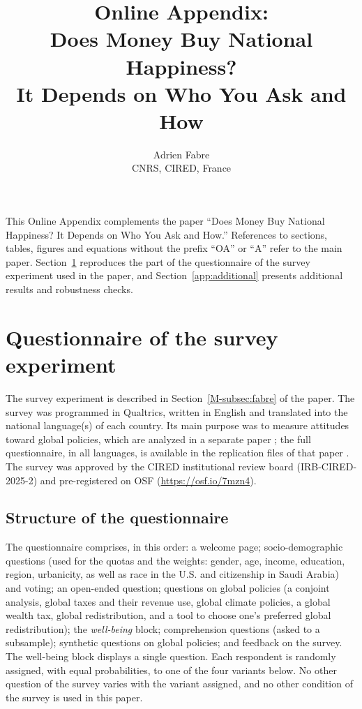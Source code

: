 \documentclass[12pt]{article}
\title{Online Appendix:\\ Does Money Buy National Happiness?\\It Depends on Who You Ask and How}
\author{Adrien Fabre\\[.5ex] \normalsize CNRS, CIRED, France}
\date{}
\begin{document}
\maketitle
\thispagestyle{plain}

\noindent This Online Appendix complements the paper ``Does Money Buy National Happiness? It Depends on Who You Ask and How.'' References to sections, tables, figures and equations without the prefix ``OA'' or ``A'' refer to the main paper. Section~\ref{app:questionnaire} reproduces the part of the questionnaire of the survey experiment used in the paper, and Section~\ref{app:additional} presents additional results and robustness checks.

\section{Questionnaire of the survey experiment}\label{app:questionnaire}

The survey experiment is described in Section~\ref{M-subsec:fabre} of the paper. The survey was programmed in Qualtrics, written in English and translated into the national language(s) of each country. Its main purpose was to measure attitudes toward global policies, which are analyzed in a separate paper \citep{fabre_public_2025}; the full questionnaire, in all languages, is available in the replication files of that paper \citep{fabre_public_2025}. The survey was approved by the CIRED institutional review board (IRB-CIRED-2025-2) and pre-registered on OSF (\href{https://osf.io/7mzn4}{https://osf.io/7mzn4}).

\subsection{Structure of the questionnaire}

The questionnaire comprises, in this order: a welcome page; socio-demographic questions (used for the quotas and the weights: gender, age, income, education, region, urbanicity, as well as race in the U.S. and citizenship in Saudi Arabia) and voting; an open-ended question; questions on global policies (a conjoint analysis, global taxes and their revenue use, global climate policies, a global wealth tax, global redistribution, and a tool to choose one's preferred global redistribution); the \textit{well-being} block; comprehension questions (asked to a subsample); synthetic questions on global policies; and feedback on the survey. The well-being block displays a single question. Each respondent is randomly assigned, with equal probabilities, to one of the four variants below. No other question of the survey varies with the variant assigned, and no other condition of the survey is used in this paper.
\end{document}
